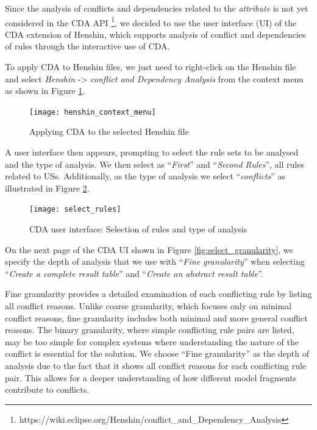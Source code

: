 Since the analysis of conflicts and dependencies related to the \textit{attribute} is not yet considered in the CDA API \footnote{https://wiki.eclipse.org/Henshin/conflict\_and\_Dependency\_Analysis}, we decided to use the user interface (UI) of the CDA extension of Henshin, which supports analysis of conflict and dependencies of rules through the interactive use of CDA.

To apply CDA to Henshin files, we just need to right-click on the Henshin file and select \textit{Henshin} -\textgreater\textit{ conflict and Dependency Analysis} from the context menu as shown in Figure \ref{fig:henshin_context_menu}.
\begin{figure}[h]
	\centering
	\texttt{[image: henshin\_context\_menu]}
	\caption{Applying CDA to the selected Henshin file}\label{fig:henshin_context_menu}
\end{figure}
A user interface then appears, prompting to select the rule sets to be analysed and the type of analysis. We then select as \enquote{\textit{First}} and \enquote{\textit{Second} \textit{Rules}}, all rules related to USs. Additionally, as the type of analysis we select \enquote{\textit{conflicts}} as illustrated in Figure \ref{fig:select_rules}.
\begin{figure}[h]
	\centering
	\texttt{[image: select\_rules]}
	\caption{CDA user interface: Selection of rules and type of analysis}\label{fig:select_rules}
\end{figure}
On the next page of the CDA UI shown in Figure \ref{fig:select_granularity}, we specify the depth of analysis that we use with \enquote{\textit{Fine granularity}} when selecting \enquote{\textit{Create a complete result table}} and \enquote{\textit{Create an abstract result table}}. 

Fine granularity provides a detailed examination of each conflicting rule by listing all conflict reasons. Unlike coarse granularity, which focuses only on minimal conflict reasons, fine granularity includes both minimal and more general conflict reasons. The binary granularity, where simple conflicting rule pairs are listed, may be too simple for complex systems where understanding the nature of the conflict is essential for the solution. 
We choose \enquote{Fine granularity} as the depth of analysis due to the fact that it shows all conflict reasons for each conflicting rule pair. This allows for a deeper understanding of how different model fragments contribute to conflicts.


